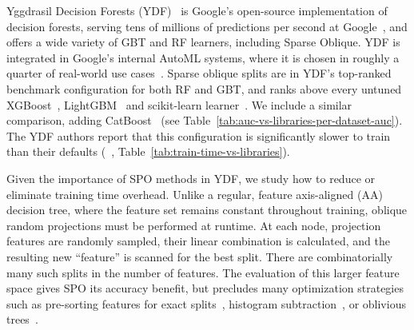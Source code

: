 \documentclass[sigconf,anonymous,review]{acmart}
\begin{document}
Yggdrasil Decision Forests (YDF)~\cite{ydf} is Google's open-source implementation of decision forests, serving tens of millions of predictions per second at Google~\cite{ydf}, and offers a wide variety of GBT and RF learners, including Sparse Oblique. YDF is integrated in Google's internal AutoML systems, where it is chosen in roughly a quarter of real-world use cases~\cite{ydf}. Sparse oblique splits are in YDF's top-ranked benchmark configuration for both RF and GBT, and ranks above every untuned XGBoost~\cite{chen2016xgboost}, LightGBM~\cite{ke2017lightgbm} and scikit-learn learner~\cite{pedregosa2011scikit}. We include a similar comparison, adding CatBoost~\cite{prokhorenkova2018catboost} (see Table~\ref{tab:auc-vs-libraries-per-dataset-auc}). The YDF authors report that this configuration is significantly slower to train than their defaults (~\cite{ydf}, Table~\ref{tab:train-time-vs-libraries}). 





Given the importance of SPO methods in YDF, we study how to reduce or eliminate training time overhead. Unlike a regular, feature axis-aligned (AA) decision tree, where the feature set remains constant throughout training, oblique random projections must be performed at runtime. At each node, projection features are randomly sampled, their linear combination is calculated, and the resulting new ``feature'' is scanned for the best split. There are combinatorially many such splits in the number of features. The evaluation of this larger feature space gives SPO its accuracy benefit, but precludes many optimization strategies such as pre-sorting features for exact splits~\cite{ydf,wright2017ranger}, histogram subtraction~\cite{chen2016xgboost,ke2017lightgbm}, or oblivious trees~\cite{prokhorenkova2018catboost}.
\end{document}
